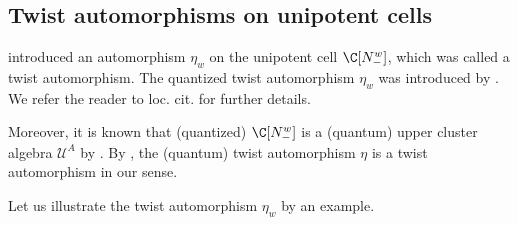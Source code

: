 \documentclass[pdftex]{sigma}
\newcommand{\upClAlg}{\mathcal{U}^A}
\numberwithin{equation}{section}
\begin{document}
\subsection{Twist automorphisms on unipotent cells}
\cite{BerensteinFominZelevinsky96,berenstein1997total} introduced
an automorphism $\eta_{w}$ on the unipotent cell $\C[N_{-}^{w}]$,
which was called a twist automorphism. The quantized twist automorphism
$\eta_{w}$ was introduced by \cite{kimura2017twist}. We refer the
reader to loc. cit. for further details.

Moreover, it is known that (quantized) $\C[N_{-}^{w}]$ is a (quantum)
upper cluster algebra $\upClAlg$ by \cite{GeissLeclercSchroeer10,GeissLeclercSchroeer11,GY13,goodearl2020integral}. By \cite{qin2020dual}, the (quantum)
twist automorphism $\eta$ is a twist automorphism in our sense.

Let us illustrate the twist automorphism $\eta_{w}$ by an example.
\end{document}
